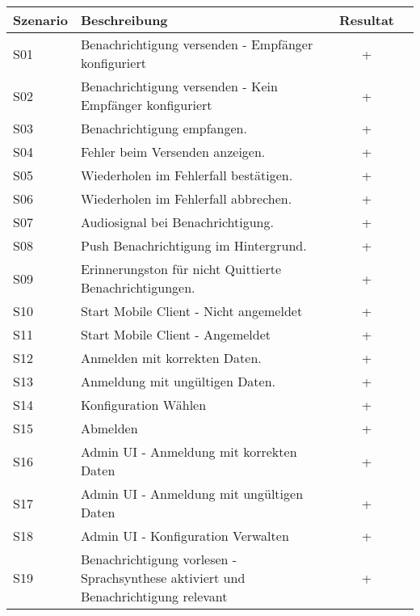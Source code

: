 \begin{table}[h]
    \centering
    \begin{tabular}{|l|p{11cm}|c|c|}
        \hline
        \textbf{Szenario} & \textbf{Beschreibung} & \textbf{Resultat} \\
        \hline
        S01         & Benachrichtigung versenden - Empfänger konfiguriert   & +\\
        \hline
        S02         & Benachrichtigung versenden - Kein Empfänger konfiguriert & +\\
        \hline
        S03         & Benachrichtigung empfangen.  & +\\
        \hline
        S04         & Fehler beim Versenden anzeigen.  & +\\
        \hline
        S05         & Wiederholen im Fehlerfall bestätigen.  & +\\
        \hline
        S06         & Wiederholen im Fehlerfall abbrechen.  & +\\
        \hline
        S07         & Audiosignal bei Benachrichtigung.   & +\\
        \hline
        S08         & Push Benachrichtigung im Hintergrund.  & +\\
        \hline
        S09         & Erinnerungston für nicht Quittierte Benachrichtigungen.   & +\\
        \hline
        S10         & Start Mobile Client - Nicht angemeldet   & +\\
        \hline
        S11         & Start Mobile Client  - Angemeldet & +\\
        \hline
        S12         & Anmelden mit korrekten Daten.   & +\\
        \hline
        S13         & Anmeldung mit ungültigen Daten.   & +\\
        \hline
        S14         & Konfiguration Wählen   & +\\
        \hline
        S15         & Abmelden   & +\\
        \hline
        S16         & Admin UI - Anmeldung mit korrekten Daten   & +\\
        \hline
        S17         & Admin UI - Anmeldung mit ungültigen Daten   & +\\
        \hline
        S18         & Admin UI - Konfiguration Verwalten   & +\\
        \hline
        S19         & Benachrichtigung vorlesen - Sprachsynthese aktiviert und Benachrichtigung relevant & +\\

\end{tabular}
\end{table}

